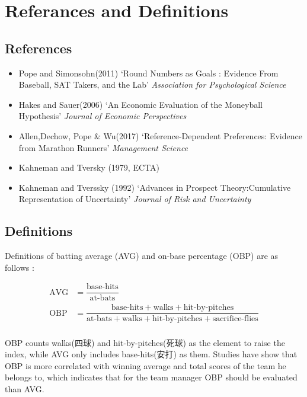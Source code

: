 \documentclass{jsarticle}[12pt]
\begin{document}
\section{Referances and Definitions}

 \subsection{References}
 
  \begin{itemize}
  
  \item Pope and Simonsohn(2011) `Round Numbers as Goals : Evidence From Baseball, SAT Takers,
and the Lab'  \textit{Association for Psychological Science}
  
  \item Hakes and Sauer(2006) `An Economic Evaluation of the Moneyball Hypothesis' \textit{Journal of Economic Perspectives}
  
  \item Allen,Dechow, Pope \& Wu(2017) `Reference-Dependent Preferences: Evidence from
Marathon Runners' \textit{Management Science}
  
  \item Kahneman and Tversky (1979, ECTA)
  
  \item Kahneman and Tverssky (1992) `Advances in Prospect Theory:Cumulative Representation of Uncertainty'  \textit{Journal of Risk and Uncertainty}
  
  \end{itemize}
 
 \subsection{Definitions}
 
 Definitions of batting average (AVG) and on-base percentage (OBP) are as follows :
 
 \begin{align*}
\text{AVG} &= \dfrac{\text{base-hits}}{\text{at-bats}} \\
\text{OBP} &= \dfrac{\text{base-hits} + \text{walks} + \text{hit-by-pitches}} 
{\text{at-bats} + \text{walks} + \text{hit-by-pitches} + \text{sacrifice-flies}} \\
\end{align*}

OBP counts walks(四球) and hit-by-pitches(死球) as the element to raise the index, while AVG only includes base-hits(安打) as them. Studies have show that OBP is more correlated with winning average and total scores of the team he belongs to, which indicates that for the team manager OBP should be evaluated than AVG.
\end{document}
